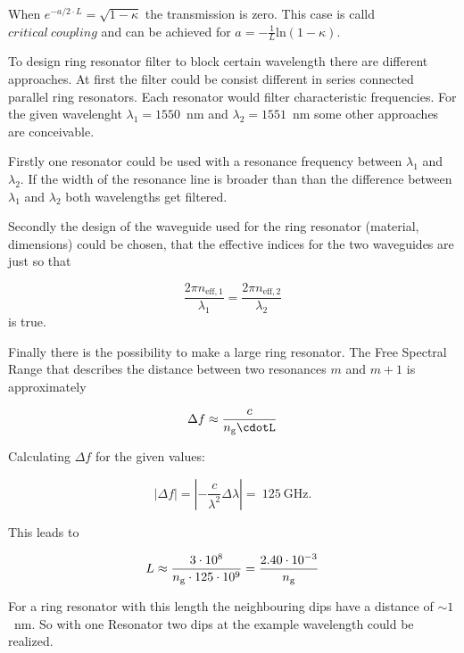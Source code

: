 When $e^{-a/2\cdot L} = \sqrt{1-\kappa}$ the transmission is zero. This case is calld $critical~coupling$ and can be achieved for $a = - \frac{1}{L}\mathrm{ln}(1-\kappa)$.

To design ring resonator filter to block certain wavelength there are different approaches.
At first the filter could be consist different in series connected parallel ring resonators. Each resonator would filter characteristic frequencies.
For the given wavelenght $\lambda_1 = 1550$~nm and $\lambda_2 = 1551$~nm some other approaches are conceivable.

Firstly one resonator could be used with a resonance frequency between $\lambda_1$ and $\lambda_2$. If the width of the resonance line is broader than than the difference between $\lambda_1$ and $\lambda_2$ both wavelengths get filtered.

Secondly the design of the waveguide used for the ring resonator (material, dimensions) could be chosen, that the effective indices for the two waveguides are just so that 

\begin{equation}
\frac{2\pi n_{\mathrm{eff,1}}}{\lambda_1} = \frac{2\pi n_{\mathrm{eff,2}}}{\lambda_2}
\label{eq:}
\end{equation}
is true.

Finally there is the possibility to make a large ring resonator. The Free Spectral Range that describes the distance between two resonances $m$ and $m+1$ is approximately

\begin{equation}
\Delta f \approx \frac{c}{n\i{g}\cdotL}
\label{eq:}
\end{equation}

Calculating $\Delta f$ for the given values:

\begin{equation}
|\Delta f| = \left|-\frac{c}{\lambda^2}\Delta\lambda\right| =~125~\mathrm{GHz}.
\label{eq:}
\end{equation}

This leads to 

\begin{equation}
L \approx \frac{3\cdot10^8}{n_{\mathrm{g}}\cdot125\cdot10^9}=\frac{2.40\cdot10^{-3}}{n_{\mathrm{g}}}
\label{eq:}
\end{equation}

For a ring resonator with this length the neighbouring dips have a distance of $\sim1$~nm. So with one Resonator two dips at the example wavelength could be realized.

